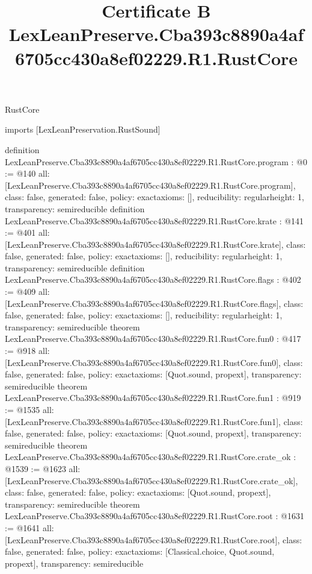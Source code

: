 \begin{lexlean}{RustCore}
\title{Certificate B LexLeanPreserve.Cba393c8890a4af6705cc430a8ef02229.R1.RustCore}
\begin{coremodule}
imports [LexLeanPreservation.RustSound]

definition LexLeanPreserve.Cba393c8890a4af6705cc430a8ef02229.R1.RustCore.program : @0 := @140 {
  all: [LexLeanPreserve.Cba393c8890a4af6705cc430a8ef02229.R1.RustCore.program],
  class: false,
  generated: false,
  policy: exact{axioms: []},
  reducibility: regular{height: 1},
  transparency: semireducible
}
definition LexLeanPreserve.Cba393c8890a4af6705cc430a8ef02229.R1.RustCore.krate : @141 := @401 {
  all: [LexLeanPreserve.Cba393c8890a4af6705cc430a8ef02229.R1.RustCore.krate],
  class: false,
  generated: false,
  policy: exact{axioms: []},
  reducibility: regular{height: 1},
  transparency: semireducible
}
definition LexLeanPreserve.Cba393c8890a4af6705cc430a8ef02229.R1.RustCore.flags : @402 := @409 {
  all: [LexLeanPreserve.Cba393c8890a4af6705cc430a8ef02229.R1.RustCore.flags],
  class: false,
  generated: false,
  policy: exact{axioms: []},
  reducibility: regular{height: 1},
  transparency: semireducible
}
theorem LexLeanPreserve.Cba393c8890a4af6705cc430a8ef02229.R1.RustCore.fun0 : @417 := @918 {
  all: [LexLeanPreserve.Cba393c8890a4af6705cc430a8ef02229.R1.RustCore.fun0],
  class: false,
  generated: false,
  policy: exact{axioms: [Quot.sound, propext]},
  transparency: semireducible
}
theorem LexLeanPreserve.Cba393c8890a4af6705cc430a8ef02229.R1.RustCore.fun1 : @919 := @1535 {
  all: [LexLeanPreserve.Cba393c8890a4af6705cc430a8ef02229.R1.RustCore.fun1],
  class: false,
  generated: false,
  policy: exact{axioms: [Quot.sound, propext]},
  transparency: semireducible
}
theorem LexLeanPreserve.Cba393c8890a4af6705cc430a8ef02229.R1.RustCore.crate_ok : @1539 := @1623 {
  all: [LexLeanPreserve.Cba393c8890a4af6705cc430a8ef02229.R1.RustCore.crate_ok],
  class: false,
  generated: false,
  policy: exact{axioms: [Quot.sound, propext]},
  transparency: semireducible
}
theorem LexLeanPreserve.Cba393c8890a4af6705cc430a8ef02229.R1.RustCore.root : @1631 := @1641 {
  all: [LexLeanPreserve.Cba393c8890a4af6705cc430a8ef02229.R1.RustCore.root],
  class: false,
  generated: false,
  policy: exact{axioms: [Classical.choice, Quot.sound, propext]},
  transparency: semireducible
}


\end{coremodule}
\end{lexlean}
